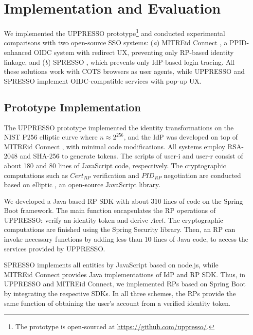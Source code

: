 \section{Implementation and Evaluation}
\label{sec:implementation}

We implemented the UPPRESSO prototype\footnote{The prototype is open-sourced at \url{https://github.com/uppresso/}.} and conducted experimental comparisons with two open-source SSO systems:
 (\emph{a}) MITREid Connect \cite{MITREid}, a PPID-enhanced OIDC system with redirect UX,
  preventing only RP-based identity linkage,
 and (\emph{b}) SPRESSO \cite{SPRESSO}, which prevents only IdP-based login tracing.
All these solutions work with COTS browsers as user agents,
    while UPPRESSO and SPRESSO implement OIDC-compatible services with pop-up UX.

\subsection{Prototype Implementation}
\label{subsec:proto-imple}

The UPPRESSO prototype implemented the identity transformations on the NIST P256 elliptic curve where $n \approx 2^{256}$,
and the IdP was developed on top of MITREid Connect \cite{MITREid}, %
with minimal code modifications.
All systems employ RSA-2048 and SHA-256 to generate tokens.
The scripts of user-i and user-r consist of about 180 and 80 lines of JavaScript code, respectively.  %
The cryptographic computations such as $Cert_{RP}$ verification and $PID_{RP}$ negotiation are conducted based on elliptic \cite{elliptic-lib}, an open-source JavaScript library.

We developed a Java-based RP SDK with about 310 lines of code on the Spring Boot framework.
The main function encapsulates the RP operations of UPPRESSO: verify an identity token and derive $Acct$. The cryptographic computations are finished using the Spring Security library.
Then, an RP can invoke necessary functions by adding less than 10 lines of Java code, to access the services provided by UPPRESSO.

SPRESSO implements all entities by JavaScript based on node.js, while MITREid Connect provides Java implementations of IdP and RP SDK.
Thus, in UPPRESSO and MITREid Connect, we implemented RPs based on Spring Boot by integrating the respective SDKs. In all three schemes, the RPs provide the same function of obtaining the user's account from a verified identity token.


